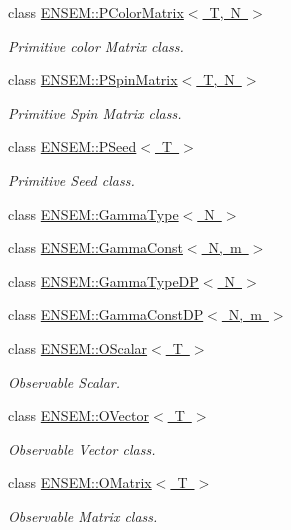 \begin{DoxyCompactItemize}
class \mbox{\hyperlink{classENSEM_1_1PColorMatrix}{E\+N\+S\+E\+M\+::\+P\+Color\+Matrix$<$ T, N $>$}}
\begin{DoxyCompactList}\small\item\em Primitive color Matrix class. \end{DoxyCompactList}\item 
class \mbox{\hyperlink{classENSEM_1_1PSpinMatrix}{E\+N\+S\+E\+M\+::\+P\+Spin\+Matrix$<$ T, N $>$}}
\begin{DoxyCompactList}\small\item\em Primitive Spin Matrix class. \end{DoxyCompactList}\item 
class \mbox{\hyperlink{classENSEM_1_1PSeed}{E\+N\+S\+E\+M\+::\+P\+Seed$<$ T $>$}}
\begin{DoxyCompactList}\small\item\em Primitive Seed class. \end{DoxyCompactList}\item 
class \mbox{\hyperlink{classENSEM_1_1GammaType}{E\+N\+S\+E\+M\+::\+Gamma\+Type$<$ N $>$}}
\item 
class \mbox{\hyperlink{classENSEM_1_1GammaConst}{E\+N\+S\+E\+M\+::\+Gamma\+Const$<$ N, m $>$}}
\item 
class \mbox{\hyperlink{classENSEM_1_1GammaTypeDP}{E\+N\+S\+E\+M\+::\+Gamma\+Type\+D\+P$<$ N $>$}}
\item 
class \mbox{\hyperlink{classENSEM_1_1GammaConstDP}{E\+N\+S\+E\+M\+::\+Gamma\+Const\+D\+P$<$ N, m $>$}}
\item 
class \mbox{\hyperlink{classENSEM_1_1OScalar}{E\+N\+S\+E\+M\+::\+O\+Scalar$<$ T $>$}}
\begin{DoxyCompactList}\small\item\em Observable Scalar. \end{DoxyCompactList}\item 
class \mbox{\hyperlink{classENSEM_1_1OVector}{E\+N\+S\+E\+M\+::\+O\+Vector$<$ T $>$}}
\begin{DoxyCompactList}\small\item\em Observable Vector class. \end{DoxyCompactList}\item 
class \mbox{\hyperlink{classENSEM_1_1OMatrix}{E\+N\+S\+E\+M\+::\+O\+Matrix$<$ T $>$}}
\begin{DoxyCompactList}\small\item\em Observable Matrix class. \end{DoxyCompactList}\item 

\end{DoxyCompactItemize}
